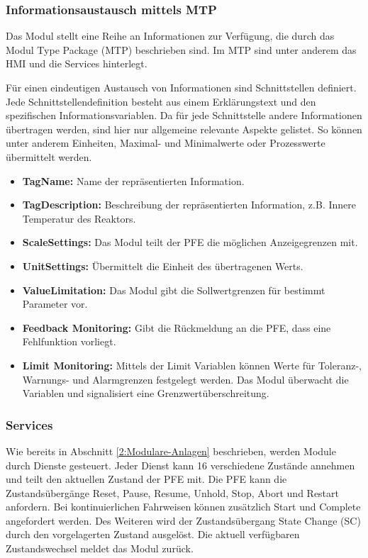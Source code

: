 \subsubsection*{Informationsaustausch mittels MTP}
Das Modul stellt eine Reihe an Informationen zur Verfügung, die durch das Modul Type Package (MTP) beschrieben sind. Im MTP sind unter anderem das HMI und die Services hinterlegt. 

Für einen eindeutigen Austausch von Informationen sind Schnittstellen definiert. Jede Schnittstellendefinition besteht aus einem Erklärungstext und den spezifischen Informationsvariablen. Da für jede Schnittstelle andere Informationen übertragen werden, sind hier nur allgemeine relevante Aspekte gelistet. So können unter anderem Einheiten, Maximal- und Minimalwerte oder Prozesswerte übermittelt werden.
\begin{itemize}
\item \textbf{TagName:} Name der repräsentierten Information. 
\item \textbf{TagDescription:} Beschreibung der repräsentierten Information, z.B. Innere Temperatur des Reaktors.
\item \textbf{ScaleSettings:} Das Modul teilt der PFE die möglichen Anzeigegrenzen mit.
\item \textbf{UnitSettings:} Übermittelt die Einheit des übertragenen Werts.
\item \textbf{ValueLimitation:} Das Modul gibt die Sollwertgrenzen für bestimmt Parameter vor.
\item \textbf{Feedback Monitoring:} Gibt die Rückmeldung an die PFE, dass eine Fehlfunktion vorliegt.
\item \textbf{Limit Monitoring:} Mittels der Limit Variablen können Werte für Toleranz-, Warnungs- und Alarmgrenzen festgelegt werden. Das Modul überwacht die Variablen und signalisiert eine Grenzwertüberschreitung.
\end{itemize}

\subsubsection*{Services}
Wie bereits in Abschnitt \ref{2:Modulare-Anlagen} beschrieben, werden Module durch Dienste gesteuert. Jeder Dienst kann 16 verschiedene Zustände annehmen und teilt den aktuellen Zustand der PFE mit. Die PFE kann die Zustandsübergänge Reset, Pause, Resume, Unhold, Stop, Abort und Restart anfordern. Bei kontinuierlichen Fahrweisen können zusätzlich Start und Complete angefordert werden. Des Weiteren wird der Zustandsübergang State Change (SC) durch den vorgelagerten Zustand ausgelöst.  Die aktuell verfügbaren Zustandswechsel meldet das Modul zurück.

